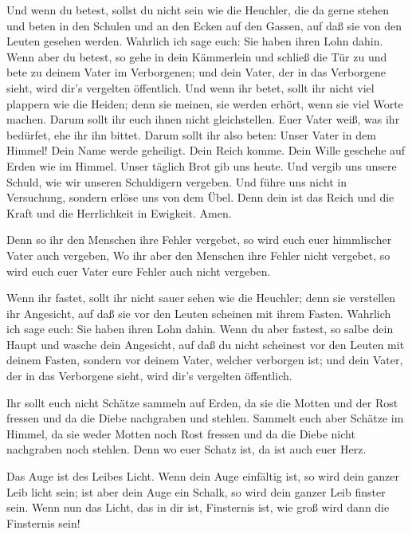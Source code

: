  Und wenn du betest, sollst du nicht sein wie die Heuchler,
die da gerne stehen und beten in den Schulen und an den Ecken auf den
Gassen, auf daß sie von den Leuten gesehen werden. Wahrlich ich sage
euch: Sie haben ihren Lohn dahin.  Wenn aber du betest, so
gehe in dein Kämmerlein und schließ die Tür zu und bete zu deinem Vater
im Verborgenen; und dein Vater, der in das Verborgene sieht, wird dir's
vergelten öffentlich.  Und wenn ihr betet, sollt ihr nicht
viel plappern wie die Heiden; denn sie meinen, sie werden erhört, wenn
sie viel Worte machen.  Darum sollt ihr euch ihnen nicht
gleichstellen. Euer Vater weiß, was ihr bedürfet, ehe ihr ihn bittet.
 Darum sollt ihr also beten: Unser Vater in dem Himmel! Dein
Name werde geheiligt.  Dein Reich komme. Dein Wille
geschehe auf Erden wie im Himmel.  Unser täglich Brot gib
uns heute.  Und vergib uns unsere Schuld, wie wir unseren
Schuldigern vergeben.  Und führe uns nicht in Versuchung,
sondern erlöse uns von dem Übel. Denn dein ist das Reich und die Kraft
und die Herrlichkeit in Ewigkeit. Amen.

 Denn so ihr den Menschen ihre Fehler vergebet, so wird
euch euer himmlischer Vater auch vergeben,  Wo ihr aber den
Menschen ihre Fehler nicht vergebet, so wird euch euer Vater eure Fehler
auch nicht vergeben.

 Wenn ihr fastet, sollt ihr nicht sauer sehen wie die
Heuchler; denn sie verstellen ihr Angesicht, auf daß sie vor den Leuten
scheinen mit ihrem Fasten. Wahrlich ich sage euch: Sie haben ihren Lohn
dahin.  Wenn du aber fastest, so salbe dein Haupt und
wasche dein Angesicht,  auf daß du nicht scheinest vor den
Leuten mit deinem Fasten, sondern vor deinem Vater, welcher verborgen
ist; und dein Vater, der in das Verborgene sieht, wird dir's vergelten
öffentlich.

 Ihr sollt euch nicht Schätze sammeln auf Erden, da sie die
Motten und der Rost fressen und da die Diebe nachgraben und stehlen.
 Sammelt euch aber Schätze im Himmel, da sie weder Motten
noch Rost fressen und da die Diebe nicht nachgraben noch stehlen.
 Denn wo euer Schatz ist, da ist auch euer Herz.

 Das Auge ist des Leibes Licht. Wenn dein Auge einfältig
ist, so wird dein ganzer Leib licht sein;  ist aber dein
Auge ein Schalk, so wird dein ganzer Leib finster sein. Wenn nun das
Licht, das in dir ist, Finsternis ist, wie groß wird dann die Finsternis
sein!

